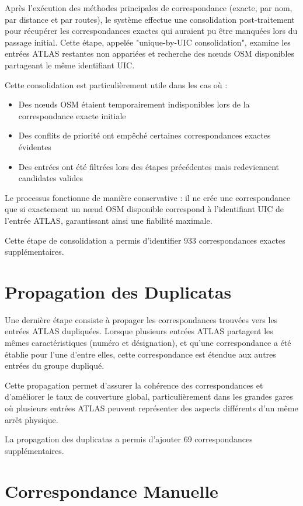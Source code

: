 Après l'exécution des méthodes principales de correspondance (exacte, par nom, par distance et par routes), le système effectue une consolidation post-traitement pour récupérer les correspondances exactes qui auraient pu être manquées lors du passage initial. Cette étape, appelée "unique-by-UIC consolidation", examine les entrées ATLAS restantes non appariées et recherche des nœuds OSM disponibles partageant le même identifiant UIC.

Cette consolidation est particulièrement utile dans les cas où :
\begin{itemize}
    \item Des nœuds OSM étaient temporairement indisponibles lors de la correspondance exacte initiale
    \item Des conflits de priorité ont empêché certaines correspondances exactes évidentes
    \item Des entrées ont été filtrées lors des étapes précédentes mais redeviennent candidates valides
\end{itemize}

Le processus fonctionne de manière conservative : il ne crée une correspondance que si exactement un nœud OSM disponible correspond à l'identifiant UIC de l'entrée ATLAS, garantissant ainsi une fiabilité maximale.

Cette étape de consolidation a permis d'identifier 933 correspondances exactes supplémentaires.

\section{Propagation des Duplicatas}

Une dernière étape consiste à propager les correspondances trouvées vers les entrées ATLAS dupliquées. Lorsque plusieurs entrées ATLAS partagent les mêmes caractéristiques (numéro et désignation), et qu'une correspondance a été établie pour l'une d'entre elles, cette correspondance est étendue aux autres entrées du groupe dupliqué.

Cette propagation permet d'assurer la cohérence des correspondances et d'améliorer le taux de couverture global, particulièrement dans les grandes gares où plusieurs entrées ATLAS peuvent représenter des aspects différents d'un même arrêt physique.

La propagation des duplicatas a permis d'ajouter 69 correspondances supplémentaires.

\section{Correspondance Manuelle}

